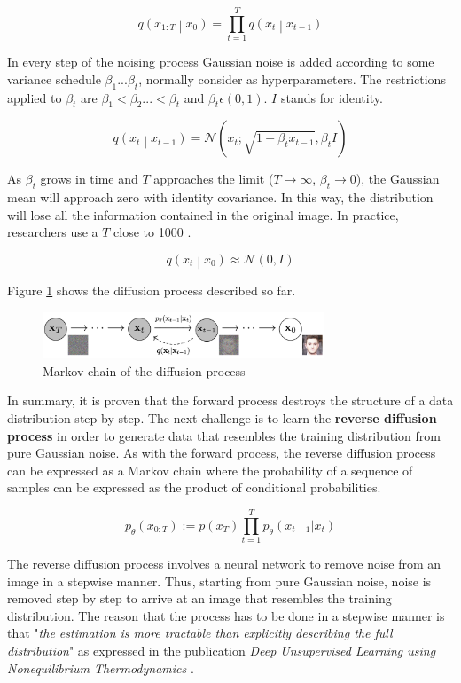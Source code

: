 \[ q\left(x_{1:T}\middle| x_0\right)=\prod_{t=1}^{T}{q\left(x_t\middle| x_{t-1}\right)} \]

In every step of the noising process Gaussian noise is added according to some variance schedule $\beta_1...\beta_t$, normally consider as hyperparameters. The restrictions applied to $\beta_t$ are $\beta_1 < \beta_2 ... < \beta_t$ and $\beta_t \epsilon (0, 1)$. $I$ stands for identity.

\[q\left(x_t\middle| x_{t-1}\right)=\mathcal{N}\left(x_t;\sqrt{1-\beta_tx_{t-1}},\beta_tI\right) \]

As $\beta_t$ grows in time and $T$ approaches the limit ($T \rightarrow\infty$, $\beta_t \rightarrow 0$), the Gaussian mean will approach zero with identity covariance. In this way, the distribution will lose all the information contained in the original image. In practice, researchers use a $T$ close to 1000 \cite{ho2020denoising}.

\[q\left(x_t\middle| x_0\right)\approx\mathcal{N}\left(0,I\right)\]

Figure \ref{fig:MarkovchainDP} shows the diffusion process described so far.

\begin{figure}
    \centering
    \includegraphics[width=0.75\textwidth]{Pictures/MarkovchainDP} 
    \caption{Markov chain of the diffusion process \cite{ho2020denoising}}
    \label{fig:MarkovchainDP}
\end{figure}

In summary, it is proven that the forward process destroys the structure of a data distribution step by step. The next challenge is to learn the \textbf{reverse diffusion process} in order to generate data that resembles the training distribution from pure Gaussian noise. As with the forward process, the reverse diffusion process can be expressed as a Markov chain where the probability of a sequence of samples can be expressed as the product of conditional probabilities.

\[ p_\theta\left(x_{0:T}\right) := p\left ( x_T \right ) \prod_{t=1}^{T}p_\theta\left ( x_{t-1} | x_t\right ) \]

The reverse diffusion process involves a neural network to remove noise from an image in a stepwise manner. Thus, starting from pure Gaussian noise, noise is removed step by step to arrive at an image that resembles the training distribution. The reason that the process has to be done in a stepwise manner is that "\textit{the estimation is more tractable than explicitly describing the full distribution}" as expressed in the publication \textit{Deep Unsupervised Learning using Nonequilibrium Thermodynamics} \cite{sohl2015deep}.

